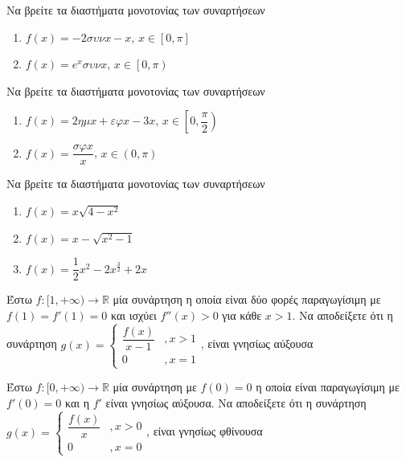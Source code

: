 \documentclass{presentation}
\begin{document}
\begin{askisi}
  Να βρείτε τα διαστήματα μονοτονίας των συναρτήσεων
  \begin{enumerate}
    \item<1-> $f(x)=-2συνx-x$, $x\in [0,\pi]$
    \item<2-> $f(x)=e^xσυνx$, $x\in \left[ 0,\pi \right) $
  \end{enumerate}

\end{askisi}

\begin{askisi}
  Να βρείτε τα διαστήματα μονοτονίας των συναρτήσεων
  \begin{enumerate}
    \item<1-> $f(x)=2ημx+εφx-3x$, $x\in \left[ 0,\dfrac{\pi}{2} \right) $
    \item<2-> $f(x)=\dfrac{σφx}{x}$, $x\in (0,\pi) $
  \end{enumerate}

\end{askisi}

\begin{askisi}
  Να βρείτε τα διαστήματα μονοτονίας των συναρτήσεων
  \begin{enumerate}
    \item<1-> $f(x)=x\sqrt{4-x^2}$
    \item<2-> $f(x)=x-\sqrt{x^2-1}$
    \item<3-> $f(x)=\dfrac{1}{2}x^2-2x^{\frac{3}{2}}+2x$
  \end{enumerate}

\end{askisi}

\begin{askisi}
  Έστω $f:[1,+\infty)\to\mathbb{R}$ μία συνάρτηση η οποία είναι δύο φορές παραγωγίσιμη με $f(1)=f'(1)=0$ και ισχύει $f''(x)>0$ για κάθε $x>1$. Να αποδείξετε ότι η συνάρτηση $g(x)=\begin{cases}
      \dfrac{f(x)}{x-1} & ,x>1 \\
      0                 & ,x=1
    \end{cases}$, είναι γνησίως αύξουσα

\end{askisi}

\begin{askisi}

  Έστω $f:[0,+\infty)\to\mathbb{R}$ μία συνάρτηση με $f(0)=0$ η οποία είναι παραγωγίσιμη με $f'(0)=0$ και η $f'$ είναι γνησίως αύξουσα. Να αποδείξετε ότι η συνάρτηση $g(x)=\begin{cases}
      \dfrac{f(x)}{x} & ,x>0 \\
      0               & ,x=0
    \end{cases}$, είναι γνησίως φθίνουσα

\end{askisi}
\end{document}
